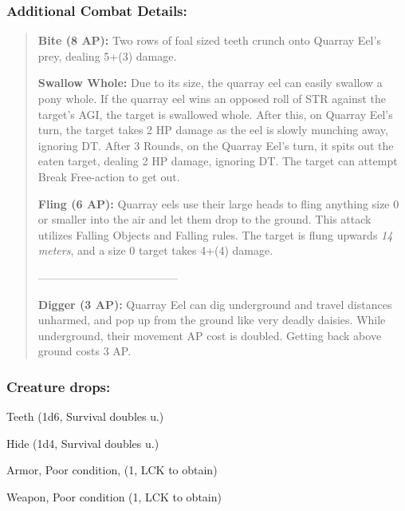 \documentclass[11pt,a4paper,twocolumn]{book}
\begin{document}
	\subsubsection*{Additional Combat Details:}
	\begin{verse}
		\textbf{Bite (8 AP):} Two rows of foal sized teeth crunch onto Quarray Eel's prey, dealing 5+(3) damage.
		
		\textbf{Swallow Whole:} Due to its size, the quarray eel can easily swallow a pony whole. If the quarray eel wins an opposed roll of STR against the target's AGI, the target is swallowed whole. After this, on Quarray Eel's turn, the target takes 2 HP damage as the eel is slowly munching away, ignoring DT. After 3 Rounds, on the Quarray Eel's turn, it spits out the eaten target, dealing 2 HP damage, ignoring DT. The target can attempt Break Free-action to get out. 
		
		\textbf{Fling (6 AP):} Quarray eels use their large heads to fling anything size 0 or smaller into the air and let them drop to the ground. This attack utilizes Falling Objects and Falling rules. The target is flung upwards \textit{14 meters}, and a size 0 target takes 4+(4) damage.
		
		--------------------------------------
		
		\textbf{Digger (3 AP):} Quarray Eel can dig underground and travel distances unharmed, and pop up from the ground like very deadly daisies. While underground, their movement AP cost is doubled. Getting back above ground costs 3 AP.
		
%		
	\end{verse}
	
	\subsubsection*{Creature drops:}
	\begin{compactitem}
		\item Teeth (1d6, Survival doubles u.)
		\item Hide (1d4, Survival doubles u.)
		\item Armor, Poor condition, (1, LCK to obtain)
		\item Weapon, Poor condition (1, LCK to obtain)
	\end{compactitem}
	
\end{document}

